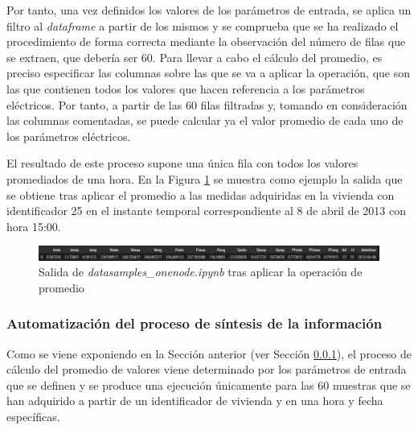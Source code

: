 \vspace{3mm}

Por tanto, una vez definidos los valores de los parámetros de entrada, se aplica un filtro al \textit{dataframe} a partir de los mismos y se comprueba que se ha realizado el procedimiento de forma correcta mediante la observación del número de filas que se extraen, que debería ser 60. Para llevar a cabo el cálculo del promedio, es preciso especificar las columnas sobre las que se va a aplicar la operación, que son las que contienen todos los valores que hacen referencia a los parámetros eléctricos. Por tanto, a partir de las 60 filas filtradas y, tomando en consideración las columnas comentadas, se puede calcular ya el valor promedio de cada uno de los parámetros eléctricos. 

\vspace{3mm}

El resultado de este proceso supone una única fila con todos los valores promediados de una hora. En la Figura \ref{fig:datasamples} se muestra como ejemplo la salida que se obtiene tras aplicar el promedio a las medidas adquiridas en la vivienda con identificador 25 en el instante temporal correspondiente al 8 de abril de 2013 con hora 15:00.

\vspace{3mm}

\begin{figure}[h!]
  \centering
  \includegraphics[width=1\textwidth]{img/diseno/datasamples.png}
  \caption{Salida de \textit{datasamples\_onenode.ipynb} tras aplicar la operación de promedio}
  \label{fig:datasamples}
\end{figure}

\subsubsection{Automatización del proceso de síntesis de la información}
\label{sec:datasamples}

Como se viene exponiendo en la Sección anterior (ver Sección \ref{sec:datasamples}), el proceso de cálculo del promedio de valores viene determinado por los parámetros de entrada que se definen y se produce una ejecución únicamente para las 60 muestras que se han adquirido a partir de un identificador de vivienda y en una hora y fecha específicas. 

\vspace{3mm}

